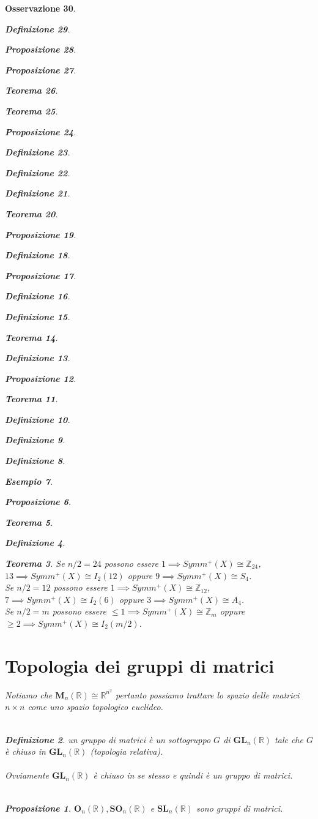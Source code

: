 \documentclass[oneside, 11pt]{amsbook}
\newcommand{\0}{{(0)}}
\newcommand{\3}{{(3)}}
\theoremstyle{colonplain}
\newtheorem{thm}{Teorema}[chapter]
\newtheorem{prop}[thm]{Proposizione}
\theoremstyle{colondefinition}
\newtheorem{defn}[thm]{Definizione}
\newtheorem{ex}[thm]{Esempio}
\theoremstyle{colonremark}
\newtheorem{rmk}[thm]{Osservazione}
\numberwithin{equation}{chapter}
\begin{document}
\begin{rmk}
\begin{defn}
\begin{prop}
\begin{prop}
\begin{thm}
\begin{thm}
\begin{prop}
\begin{defn}
\begin{defn}
\begin{defn}
\begin{thm}
\begin{prop}
\begin{defn}
\begin{prop}
\begin{defn}
\begin{defn}
\begin{thm}
\begin{defn}
\begin{prop}
\begin{thm}
\begin{defn}
\begin{defn}
\begin{defn}
\begin{ex}
\begin{prop}
\begin{thm}
\begin{defn}
\begin{thm}
Se $n/2 = 24$ possono essere $1 \implies Symm^+(X) \cong \mathbb{Z}_{24}$, $13 \implies Symm^+(X) \cong I_2(12)$ oppure $9 \implies Symm^+(X) \cong S_4$. \\
Se $n/2 = 12$ possono essere $1 \implies Symm^+(X) \cong \mathbb{Z}_{12}$, $7 \implies Symm^+(X) \cong I_2(6)$ oppure $3 \implies Symm^+(X) \cong A_4$. \\
Se $n/2 = m$ possono essere $\leq 1 \implies Symm^+(X) \cong \mathbb{Z}_m$ oppure $\geq 2 \implies Symm^+(X) \cong I_2(m/2)$.

\newpage
\section{Topologia dei gruppi di matrici}
Notiamo che $\mathbf{M}_n(\mathbb{R}) \cong \mathbb{R}^{n^2}$ pertanto possiamo trattare lo spazio delle matrici $n \times n$ come uno spazio topologico euclideo. \\ \\
\begin{defn} un \textit{gruppo di matrici} è un sottogruppo $G$ di $\mathbf{GL}_n(\mathbb{R})$ tale che $G$ è chiuso in $\mathbf{GL}_n(\mathbb{R})$ (topologia relativa). \\ \\
Ovviamente $\mathbf{GL}_n(\mathbb{R})$ è chiuso in se stesso e quindi è un gruppo di matrici. \\ \\
\begin{prop} $\mathbf{O}_n(\mathbb{R}), \mathbf{SO}_n(\mathbb{R})$ e $\mathbf{SL}_n(\mathbb{R})$ sono gruppi di matrici. \\


\end{prop}
\end{defn}
\end{thm}
\end{defn}
\end{thm}
\end{prop}
\end{ex}
\end{defn}
\end{defn}
\end{defn}
\end{thm}
\end{prop}
\end{defn}
\end{thm}
\end{defn}
\end{defn}
\end{prop}
\end{defn}
\end{prop}
\end{thm}
\end{defn}
\end{defn}
\end{defn}
\end{prop}
\end{thm}
\end{thm}
\end{prop}
\end{prop}
\end{defn}
\end{rmk}
\end{document}
